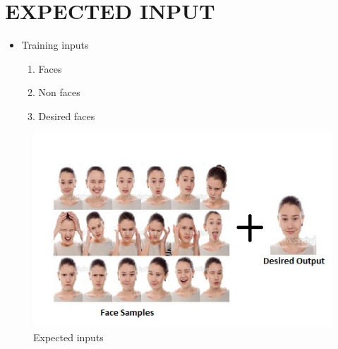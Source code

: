 \documentclass[11pt,a4paper,twoside]{report}
\begin{document}
\chapter{EXPECTED INPUT}
\begin{itemize}
\item Training inputs
\begin{enumerate}
\item Faces
\item Non faces
\item Desired faces
\end{enumerate}

\end{itemize}
\begin{figure}[htpb]
\begin{center}
\includegraphics[scale=1]{input.jpg}
\caption{Expected inputs}
\end{center}
\end{figure}
\newpage
\end{document}
